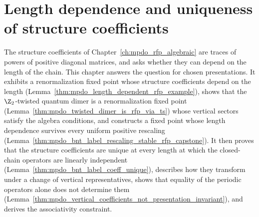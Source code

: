\chapter{Length dependence and uniqueness of structure coefficients}
\label{ch:mpdo_rfp_algebraic_coefficients}

The structure coefficients of Chapter~\ref{ch:mpdo_rfp_algebraic} are traces
of powers of positive diagonal matrices, and \cite[Section~4.5]{Cirac2016MPDO_arXiv}
asks whether they can depend on the length of the chain. This chapter
answers the question for chosen presentations. It exhibits a renormalization
fixed point whose structure coefficients depend on the length
(Lemma~\ref{thm:mpdo_length_dependent_rfp_example}), shows that the
$\Z_2$-twisted quantum dimer is a renormalization fixed point
(Lemma~\ref{thm:mpdo_twisted_dimer_is_rfp_via_ts}) whose vertical sectors satisfy
the algebra conditions, and constructs a fixed point whose length dependence
survives every uniform positive rescaling
(Lemma~\ref{thm:mpdo_bnt_label_rescaling_stable_rfp_capstone}). It then
proves that the structure coefficients are unique at every length at which the
closed-chain operators are linearly independent
(Lemma~\ref{thm:mpdo_bnt_label_coeff_unique}), describes how they transform
under a change of vertical representatives, shows that equality of the
periodic operators alone does not determine them
(Lemma~\ref{thm:mpdo_vertical_coefficients_not_presentation_invariant}), and
derives the associativity constraint.


